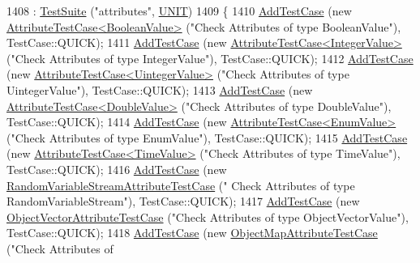 \begin{DoxyCode}
1408   : \hyperlink{classns3_1_1TestSuite_a904b0c40583b744d30908aeb94636d1a}{TestSuite} (\textcolor{stringliteral}{"attributes"}, \hyperlink{classns3_1_1TestSuite_a1ebfcab34ec8161e085e8e3a1855eae0a3885375a3787abf60431f8454b3cadbd}{UNIT})
1409 \{
1410   \hyperlink{classns3_1_1TestCase_a3718088e3eefd5d6454569d2e0ddd835}{AddTestCase} (\textcolor{keyword}{new} \hyperlink{classAttributeTestCase}{AttributeTestCase<BooleanValue>} (\textcolor{stringliteral}{"Check
       Attributes of type BooleanValue"}), TestCase::QUICK);
1411   \hyperlink{classns3_1_1TestCase_a3718088e3eefd5d6454569d2e0ddd835}{AddTestCase} (\textcolor{keyword}{new} \hyperlink{classAttributeTestCase}{AttributeTestCase<IntegerValue>} (\textcolor{stringliteral}{"Check
       Attributes of type IntegerValue"}), TestCase::QUICK);
1412   \hyperlink{classns3_1_1TestCase_a3718088e3eefd5d6454569d2e0ddd835}{AddTestCase} (\textcolor{keyword}{new} \hyperlink{classAttributeTestCase}{AttributeTestCase<UintegerValue>} (\textcolor{stringliteral}{"Check
       Attributes of type UintegerValue"}), TestCase::QUICK);
1413   \hyperlink{classns3_1_1TestCase_a3718088e3eefd5d6454569d2e0ddd835}{AddTestCase} (\textcolor{keyword}{new} \hyperlink{classAttributeTestCase}{AttributeTestCase<DoubleValue>} (\textcolor{stringliteral}{"Check
       Attributes of type DoubleValue"}), TestCase::QUICK);
1414   \hyperlink{classns3_1_1TestCase_a3718088e3eefd5d6454569d2e0ddd835}{AddTestCase} (\textcolor{keyword}{new} \hyperlink{classAttributeTestCase}{AttributeTestCase<EnumValue>} (\textcolor{stringliteral}{"Check Attributes
       of type EnumValue"}), TestCase::QUICK);
1415   \hyperlink{classns3_1_1TestCase_a3718088e3eefd5d6454569d2e0ddd835}{AddTestCase} (\textcolor{keyword}{new} \hyperlink{classAttributeTestCase}{AttributeTestCase<TimeValue>} (\textcolor{stringliteral}{"Check Attributes
       of type TimeValue"}), TestCase::QUICK);
1416   \hyperlink{classns3_1_1TestCase_a3718088e3eefd5d6454569d2e0ddd835}{AddTestCase} (\textcolor{keyword}{new} \hyperlink{classRandomVariableStreamAttributeTestCase}{RandomVariableStreamAttributeTestCase} (\textcolor{stringliteral}{"
      Check Attributes of type RandomVariableStream"}), TestCase::QUICK);
1417   \hyperlink{classns3_1_1TestCase_a3718088e3eefd5d6454569d2e0ddd835}{AddTestCase} (\textcolor{keyword}{new} \hyperlink{classObjectVectorAttributeTestCase}{ObjectVectorAttributeTestCase} (\textcolor{stringliteral}{"Check Attributes
       of type ObjectVectorValue"}), TestCase::QUICK);
1418   \hyperlink{classns3_1_1TestCase_a3718088e3eefd5d6454569d2e0ddd835}{AddTestCase} (\textcolor{keyword}{new} \hyperlink{classObjectMapAttributeTestCase}{ObjectMapAttributeTestCase} (\textcolor{stringliteral}{"Check Attributes of
}
\end{DoxyCode}
